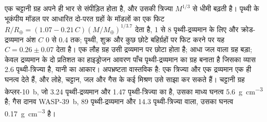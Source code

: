 एक चट्टानी ग्रह अपने ही भार से संपीड़ित होता है, और उसकी त्रिज्या
$M^{1/3}$ से धीमी बढ़ती है। पृथ्वी के भूकंपीय मॉडल पर आधारित दो-परत ग्रहों के मॉडलों
का एक फिट $R/R_\oplus = (1.07 - 0.21\,C)
(M/M_\oplus)^{1/3.7}$ देता है, 1 से 8 पृथ्वी-द्रव्यमान के लिए और क्रोड-द्रव्यमान अंश
$C$ 0 से 0.4 तक; पृथ्वी, शुक्र और कुछ छोटे
बहिर्ग्रहों पर फिट करने पर यह $C = 0.26 \pm 0.07$ देता है।
एक लौह ग्रह उसी द्रव्यमान पर छोटा होता है; आधा जल वाला ग्रह बड़ा;
केवल द्रव्यमान के दो प्रतिशत का हाइड्रोजन आवरण पाँच पृथ्वी-द्रव्यमान का ग्रह बनाता है
जिसका व्यास \num{2.6} पृथ्वी-त्रिज्या है, यानी
 का आकार। अपभ्रष्टता वास्तविक है: एक त्रिज्या और एक द्रव्यमान एक ही घनत्व देते हैं, और
लोहे, चट्टान, जल और गैस के कई मिश्रण उसे साझा कर सकते हैं।
चट्टानी ग्रह केप्लर-10~b, जो 3.24 पृथ्वी-द्रव्यमान और 1.47 पृथ्वी-त्रिज्या का है,
उसका माध्य घनत्व \qty{5.6}{g.cm^{-3}} है; गैस दानव WASP-39~b,
89 पृथ्वी-द्रव्यमान और 14.3 पृथ्वी-त्रिज्या वाला, उसका घनत्व \qty{0.17}{g.cm^{-3}} है।

